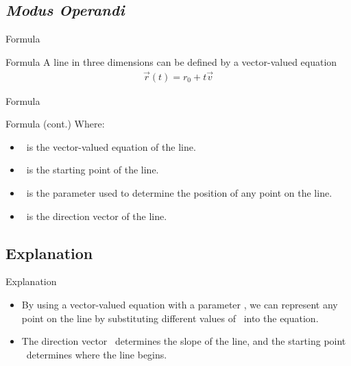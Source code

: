 \subsection{\textit{Modus Operandi}}
\frame{\subsectionpage}
\begin{frame}{Formula}
    \begin{block}{Formula}
        A line in three dimensions can be defined by a vector-valued equation
        \begin{align*}
            \vec{r}(t) = r_0 + t \vec{v}
        \end{align*}
    \end{block}
\end{frame}
\begin{frame}{Formula}
    \begin{block}{Formula (cont.)}
        Where:
        \begin{itemize}
            \item<2->{\begingroup{}\endgroup \ is the vector-valued equation of the line.}
            \item<3->{\begingroup{}\endgroup \ is the starting point of the line.}
            \item<4->{\begingroup{}\endgroup \ is the parameter used to determine the position of any point on the line.}
            \item<5>{\begingroup{}\endgroup \ is the direction vector of the line.}
        \end{itemize}
    \end{block}
\end{frame}
\subsection{Explanation}
\frame{\subsectionpage}
\begin{frame}{Explanation}
    \begin{itemize}
        \item<2->{By using a vector-valued equation with a parameter \begingroup{}\endgroup , we can represent any point on the line by substituting different values of \begingroup{}\endgroup \ into the equation.}
        \item<3->{The direction vector \begingroup{}\endgroup \ determines the slope of the line, and the starting point \begingroup{}\endgroup \ determines where the line begins.}
    \end{itemize}
\end{frame}
